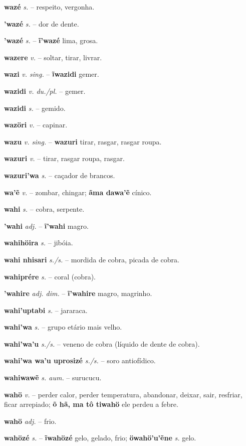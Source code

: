 \textbf{wazé} \textit{s.} -- respeito, vergonha.

\textbf{'wazé} \textit{s.} -- dor de dente.

\textbf{'wazé} \textit{s.} -- \textbf{ĩ'wazé} lima, grosa.

\textbf{wazere} \textit{v.} -- soltar, tirar, livrar.

\textbf{wazi} \textit{v. sing.} -- \textbf{ĩwazidi} gemer.

\textbf{wazidi} \textit{v. du./pl.} -- gemer.

\textbf{wazidi} \textit{s.} -- gemido.

\textbf{wazöri} \textit{v.} -- capinar.

\textbf{wazu} \textit{v. sing.} -- \textbf{wazuri} tirar, rasgar, rasgar roupa.

\textbf{wazuri} \textit{v.} -- tirar, rasgar roupa, rasgar.

\textbf{wazuri'wa} \textit{s.} -- caçador de brancos.

\textbf{wa'ẽ} \textit{v.} -- zombar, chingar; \textbf{ãma dawa'ẽ} cínico.

\textbf{wahi} \textit{s.} -- cobra, serpente.

\textbf{'wahi} \textit{adj.} -- \textbf{ĩ'wahi} magro.

\textbf{wahihöira} \textit{s.} -- jibóia.

\textbf{wahi nhisari} \textit{s./s.} -- mordida de cobra, picada de cobra.

\textbf{wahiprére} \textit{s.} -- coral (cobra).

\textbf{'wahire} \textit{adj. dim.} -- \textbf{ĩ'wahire} magro, magrinho.

\textbf{wahi'uptabi} \textit{s.} -- jararaca.

\textbf{wahi'wa} \textit{s.} -- grupo etário mais velho.

\textbf{wahi'wa'u} \textit{s./s.} -- veneno de cobra (líquido de dente de cobra).

\textbf{wahi'wa wa'u uprosizé} \textit{s./s.} -- soro antiofídico.

\textbf{wahiwawẽ} \textit{s. aum.} -- surucucu.

\textbf{wahö} \textit{v.} -- perder calor, perder temperatura, abandonar, deixar, sair, resfriar, ficar arrepiado; \textbf{õ hã, ma tô tiwahö} ele perdeu a febre.

\textbf{wahö} \textit{adj.} -- frio.

\textbf{wahözé} \textit{s.} -- \textbf{ĩwahözé} gelo, gelado, frio; \textbf{öwahö'u'ẽne} \textit{s.} gelo.


